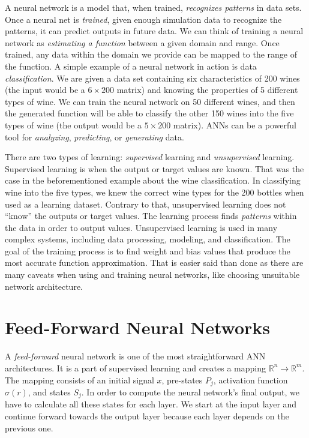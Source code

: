 A neural network is a model that, when trained, \textit{recognizes patterns} in data sets.
Once a neural net is \textit{trained}, given enough simulation data to recognize the patterns, it can predict outputs in future data.
We can think of training a neural network as \textit{estimating a function} between a given domain and range.
Once trained, any data within the domain we provide can be mapped to the range of the function.
A simple example of a neural network in action is data \textit{classification}.
We are given a data set containing six characteristics of 200 wines (the input would be a $6 \times 200$ matrix) and knowing the properties of 5 different types of wine.
We can train the neural network on 50 different wines, and then the generated function will be able to classify the other 150 wines into the five types of wine (the output would be a $5 \times 200$ matrix).
ANNs can be a powerful tool for \textit{analyzing}, \textit{predicting}, or \textit{generating} data.~\cite{ann-basics}

There are two types of learning: \textit{supervised} learning and \textit{unsupervised} learning.
Supervised learning is when the output or target values are known.
That was the case in the beforementioned example about the wine classification.
In classifying wine into the five types, we knew the correct wine types for the 200 bottles when used as a learning dataset.
Contrary to that, unsupervised learning does not ``know'' the outputs or target values.
The learning process finds \textit{patterns} within the data in order to output values.
Unsupervised learning is used in many complex systems, including data processing, modeling, and classification.
The goal of the training process is to find weight and bias values that produce the most accurate function approximation.
That is easier said than done as there are many caveats when using and training neural networks, like choosing unsuitable network architecture.~\cite{ann-basics}


\section{Feed-Forward Neural Networks}\label{sec:feed-forward-neural-networks}

A \textit{feed-forward} neural network is one of the most straightforward ANN architectures.
It is a part of supervised learning and creates a mapping $\mathbb{R}^n \to \mathbb{R}^m$.
The mapping consists of an initial signal $x$, pre-states $P_j$, activation function $\sigma (r)$, and states $S_j$.
In order to compute the neural network's final output, we have to calculate all these states for each layer.
We start at the input layer and continue forward towards the output layer because each layer depends on the previous one.~\cite{ann-basics}

